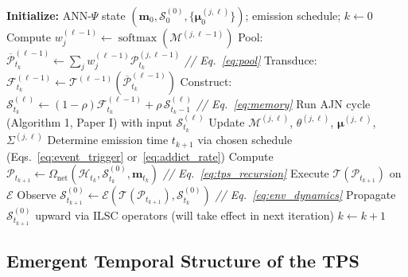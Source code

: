 \documentclass[12pt,a4paper]{article}
\DeclareMathOperator{\softmax}{softmax}
\newcommand{\tens}[1]{\boldsymbol{\mathcal{#1}}}
\begin{document}
\begin{algorithm}[H]
\caption{Deep Agentic Flow — Full Operational Cycle}
\begin{algorithmic}[1]
\STATE \textbf{Initialize:} ANN-$\Psi$ state $(\mathbf{m}_0, \tens{S}_0^{(0)},
       \{\boldsymbol{\mu}^{(j,\ell)}_0\})$; emission schedule; $k \leftarrow 0$
        \STATE Compute $w_j^{(\ell-1)} \leftarrow \softmax(\mathcal{M}^{(j,\ell-1)})$
        \STATE Pool: $\overline{\tens{P}}_{t_k}^{(\ell-1)}
               \leftarrow \sum_j w_j^{(\ell-1)} \tens{P}_{t_k}^{(j,\ell-1)}$
               \hfill \textit{// Eq.~\eqref{eq:pool}}
        \STATE Transduce: $\tens{F}_{t_k}^{(\ell-1)}
               \leftarrow \mathcal{T}^{(\ell-1)}(\overline{\tens{P}}_{t_k}^{(\ell-1)})$
        \STATE Construct: $\tens{S}_{t_k}^{(\ell)}
               \leftarrow (1-\rho)\tens{F}_{t_k}^{(\ell-1)}
               + \rho\,\tens{S}_{t_k-1}^{(\ell)}$
               \hfill \textit{// Eq.~\eqref{eq:memory}}
    \ENDFOR
        \STATE Run AJN cycle (Algorithm 1, Paper I) with input $\tens{S}_{t_k}^{(\ell)}$
        \STATE Update $\mathcal{M}^{(j,\ell)}$, $\theta^{(j,\ell)}$,
               $\boldsymbol{\mu}^{(j,\ell)}$, $\Sigma^{(j,\ell)}$
    \ENDFOR
    \STATE Determine emission time $t_{k+1}$ via chosen schedule
           (Eqs.~\eqref{eq:event_trigger} or~\eqref{eq:addict_rate})
    \STATE Compute $\tens{P}_{t_{k+1}} \leftarrow
           \Omega_{\text{net}}(\mathcal{H}_{t_k},
           \tens{S}_{t_k}^{(0)}, \mathbf{m}_{t_k})$
           \hfill \textit{// Eq.~\eqref{eq:tps_recursion}}
    \STATE Execute $\mathcal{T}(\tens{P}_{t_{k+1}})$ on $\mathcal{E}$
    \STATE Observe $\tens{S}_{t_{k+1}}^{(0)} \leftarrow
           \mathcal{E}(\mathcal{T}(\tens{P}_{t_{k+1}}), \tens{S}_{t_k}^{(0)})$
           \hfill \textit{// Eq.~\eqref{eq:env_dynamics}}
    \STATE Propagate $\tens{S}_{t_{k+1}}^{(0)}$ upward via ILSC operators
           (will take effect in next iteration)
    \STATE $k \leftarrow k+1$
\ENDWHILE
\end{algorithmic}
\end{algorithm}

\subsection{Emergent Temporal Structure of the TPS}
\end{document}
